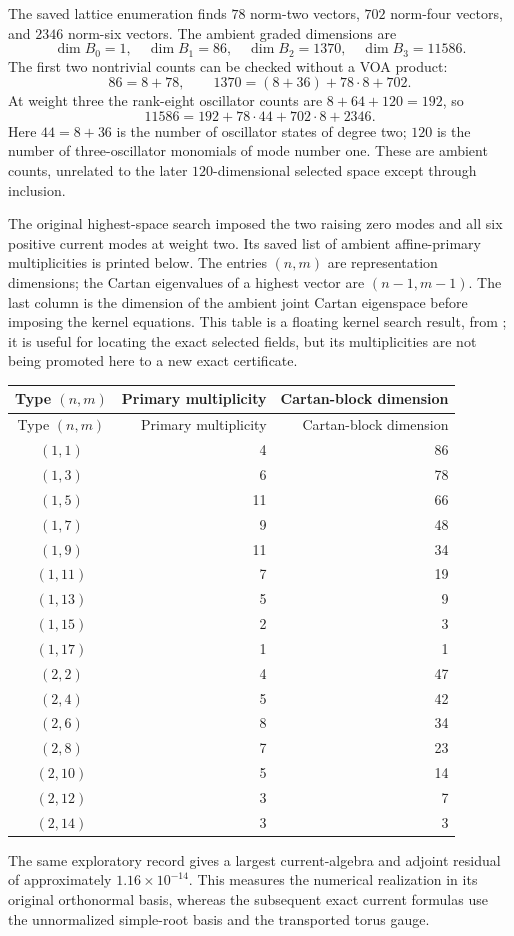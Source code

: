 The saved lattice enumeration finds $78$ norm-two vectors, $702$
norm-four vectors, and $2346$ norm-six vectors. The ambient graded
dimensions are
\[
 \dim B_0=1,\quad\dim B_1=86,\quad
 \dim B_2=1370,\quad\dim B_3=11586.
\]
The first two nontrivial counts can be checked without a VOA product:
\[
86=8+78,
\qquad
1370=(8+36)+78\cdot8+702.
\]
At weight three the rank-eight oscillator counts are
$8+64+120=192$, so
\[
11586=192+78\cdot44+702\cdot8+2346.
\]
Here $44=8+36$ is the number of oscillator states of degree two;
$120$ is the number of three-oscillator monomials of mode number one.
These are ambient counts, unrelated to the later $120$-dimensional
selected space except through inclusion.

The original highest-space search imposed the two raising zero modes
and all six positive current modes at weight two. Its saved list of
ambient affine-primary multiplicities is printed below. The entries
$(n,m)$ are representation dimensions; the Cartan eigenvalues of a
highest vector are $(n-1,m-1)$. The last column is the dimension of the
ambient joint Cartan eigenspace before imposing the kernel equations.
This table is a floating kernel search result, from
; it is useful for
locating the exact selected fields, but its multiplicities are not
being promoted here to a new exact certificate.

\begin{longtable}{@{}crr@{}}
\toprule Type $(n,m)$&Primary multiplicity&Cartan-block dimension\\\midrule\endfirsthead
\toprule Type $(n,m)$&Primary multiplicity&Cartan-block dimension\\\midrule\endhead
\bottomrule\endfoot
$(1,1)$ & 4 & 86\\
$(1,3)$ & 6 & 78\\
$(1,5)$ & 11 & 66\\
$(1,7)$ & 9 & 48\\
$(1,9)$ & 11 & 34\\
$(1,11)$ & 7 & 19\\
$(1,13)$ & 5 & 9\\
$(1,15)$ & 2 & 3\\
$(1,17)$ & 1 & 1\\
$(2,2)$ & 4 & 47\\
$(2,4)$ & 5 & 42\\
$(2,6)$ & 8 & 34\\
$(2,8)$ & 7 & 23\\
$(2,10)$ & 5 & 14\\
$(2,12)$ & 3 & 7\\
$(2,14)$ & 3 & 3\\
\end{longtable}
The same exploratory record gives a largest current-algebra and
adjoint residual of approximately $1.16\times10^{-14}$. This measures
the numerical realization in its original orthonormal basis, whereas
the subsequent exact current formulas use the unnormalized simple-root
basis and the transported torus gauge.

